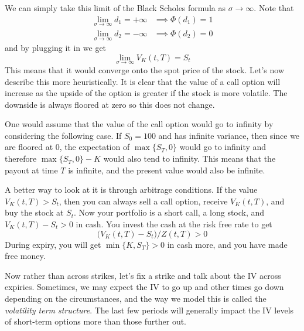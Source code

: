 \documentclass{article}
\begin{document}
    \begin{solution}
      We can simply take this limit of the Black Scholes formula as $\sigma \rightarrow \infty$. Note that 
      \begin{align}
        \lim_{\sigma \rightarrow \infty} d_1 = + \infty & \implies \Phi(d_1) = 1 \\ 
        \lim_{\sigma \rightarrow \infty} d_2 = - \infty & \implies \Phi(d_2) = 0
      \end{align}
      and by plugging it in we get 
      \begin{equation}
        \lim_{\sigma \rightarrow \infty} V_K (t, T) = S_t 
      \end{equation}
      This means that it would converge onto the spot price of the stock. Let's now describe this more heuristically. It is clear that the value of a call option will increase as the upside of the option is greater if the stock is more volatile. The downside is always floored at zero so this does not change. 

      One would assume that the value of the call option would go to infinity by considering the following case. If $S_0 = 100$ and has infinite variance, then since we are floored at $0$, the expectation of $\max\{S_T, 0\}$ would go to infinity and therefore $\max\{S_T, 0\} - K$ would also tend to infinity. This means that the payout at time $T$ is infinite, and the present value would also be infinite. 

      A better way to look at it is through arbitrage conditions. If the value $V_K (t, T) > S_t$, then you can always sell a call option, receive $V_K(t, T)$, and buy the stock at $S_t$. Now your portfolio is a short call, a long stock, and $V_K (t, T) - S_t > 0$ in cash. You invest the cash at the risk free rate to get 
      \begin{equation}
        \big( V_K (t, T) - S_t \big) / Z(t, T) > 0
      \end{equation}
      During expiry, you will get $\min\{K, S_T\} > 0$ in cash more, and you have made free money. 
    \end{solution}

    Now rather than across strikes, let's fix a strike and talk about the IV across expiries. Sometimes, we may expect the IV to go up and other times go down depending on the circumstances, and the way we model this is called the \textit{volatility term structure}. The last few periods will generally impact the IV levels of short-term options more than those further out.
\end{document}
